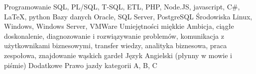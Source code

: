 

\begin{cvskills}
	\cvskill
		{Programowanie} 
		{SQL, PL/SQL, T-SQL, ETL, PHP, Node.JS, javascript, C\#, \LaTeX, python} 
	\cvskill
		{Bazy danych} 
		{Oracle, SQL Server, PostgreSQL} 
	\cvskill
		{Środowiska} 
		{Linux, Windows, Windows Server, VMWare} 
	\cvskill
		{Umiejętności miękkie} 
		{Ambicja, ciągłe doskonalenie, diagnozowanie i rozwiązywanie problemów, komunikacja z użytkownikami biznesowymi, \newline transfer wiedzy, analityka biznesowa, praca zespołowa, znajdowanie wąskich gardeł} 
	\cvskill
		{Język}
		{Angielski (płynny w mowie i piśmie)}
	\cvskill
		{Dodatkowe}
		{Prawo jazdy kategorii A, B, C}
\end{cvskills}
